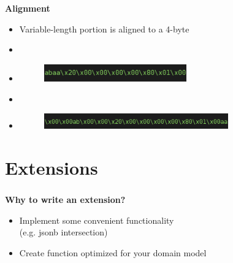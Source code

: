 \documentclass[usenames,dvipsnames, 18pt, compress, aspectratio=169]{beamer}
\begin{document}
\begin{frame}
    \frametitle{}
    \begin{center}
    \textbf{Alignment}

    \begin{itemize}[label={}]
        \item Variable-length portion is aligned to a 4-byte
        \item \inputminted[fontsize=\Large]{sql}{sql/insert_align1.sql}
        \item \begin{figure}
            \includegraphics[width=0.58\textwidth,left]{align_short.png}
        \end{figure}

        \item \inputminted[fontsize=\Large]{sql}{sql/insert_align2.sql}
        \item \begin{figure}
            \includegraphics[width=0.75\textwidth,left]{align_long.png}
        \end{figure}

    \end{itemize}

    \end{center}
\end{frame}

\fontsize{13pt}{14}\selectfont
\section{Extensions}
\fontsize{17pt}{18}\selectfont

\begin{frame}
    \frametitle{}
    \begin{center}
        \textbf{Why to write an extension?}

        \vspace{1cm}
        \begin{itemize}[label={\MVRightarrow}]
            \item Implement some convenient functionality\\ (e.g. jsonb intersection)
            \item Create function optimized for your domain model
        \end{itemize}

    \end{center}
\end{frame}
\end{document}
